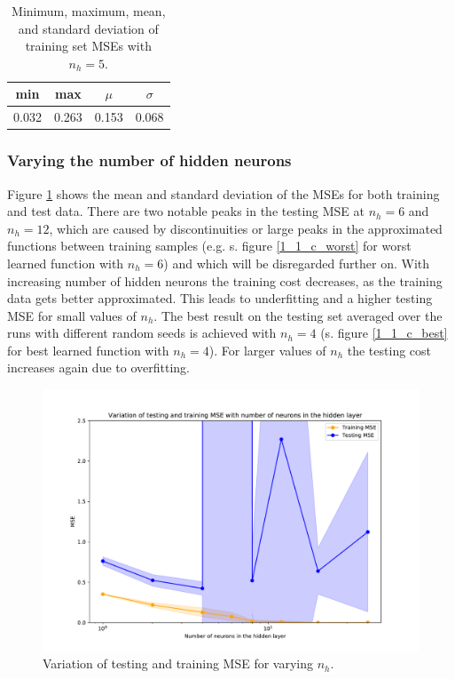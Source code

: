 \documentclass{article}
\begin{document}
\begin{table}[!ht]
\centering
\begin{tabular}{|c|c|c|c|} \hline
min & max 	& $\mu$ 	& $\sigma$ \\ \hline
0.032	& 0.263		& 0.153		& 0.068  \\ \hline
\end{tabular}
\caption{Minimum, maximum, mean, and standard deviation of training set MSEs with $n_h=5$.}
\label{1_1_b}
\end{table}


\subsubsection{Varying the number of hidden neurons}

Figure \ref{1_1_c_mse} shows the mean and standard deviation of the MSEs for both training and test data. There are two notable peaks in the testing MSE at $n_h=6$ and $n_h=12$, which are caused by discontinuities or large peaks in the approximated functions between training samples (e.g. s. figure \ref{1_1_c_worst} for worst learned function with $n_h=6$) and which will be disregarded further on. With increasing number of hidden neurons the training cost decreases, as the training data gets better approximated. This leads to underfitting and a higher testing MSE for small values of $n_h$. The best result on the testing set averaged over the runs with different random seeds is achieved with $n_h=4$ (s. figure \ref{1_1_c_best} for best learned function with $n_h=4$). For larger values of $n_h$ the testing cost increases again due to overfitting.

\begin{figure}[!ht]
\centering
\includegraphics[width=\textwidth]{./Figures/1_1_c_mse.pdf}
\caption{Variation of testing and training MSE for varying $n_h$.}
\label{1_1_c_mse}
\end{figure}
\end{document}
